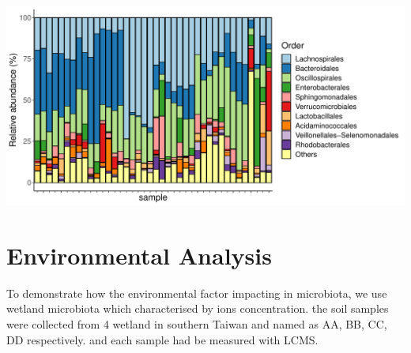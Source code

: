 \documentclass[
]{article}
\begin{document}
\includegraphics{workshop_files/figure-latex/unnamed-chunk-25-1.pdf}

\hypertarget{environmental-analysis}{%
\section{Environmental Analysis}\label{environmental-analysis}}

To demonstrate how the environmental factor impacting in microbiota, we
use wetland microbiota which characterised by ions concentration. the
soil samples were collected from 4 wetland in southern Taiwan and named
as AA, BB, CC, DD respectively. and each sample had be measured with
LCMS.
\end{document}
